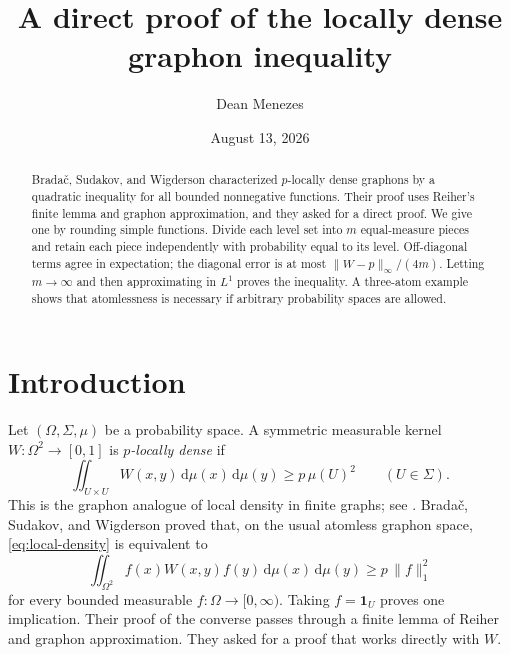 \documentclass[reqno]{amsart}
\theoremstyle{plain}
\theoremstyle{remark}
\newcommand{\one}{\mathbf 1}
\newcommand{\dd}{\,\mathrm d}
\newcommand{\norminf}[1]{\lVert #1\rVert_\infty}
\newcommand{\normone}[1]{\lVert #1\rVert_1}
\begin{document}
\title[A direct proof of the locally dense graphon inequality]
      {A direct proof of the locally dense graphon inequality}

\author{Dean Menezes}
\address{The University of Texas at Austin, Austin, Texas 78712, USA}
\date{August 13, 2026}

\begin{abstract}
Brada\v{c}, Sudakov, and Wigderson characterized $p$-locally dense graphons by
a quadratic inequality for all bounded nonnegative functions. Their proof uses
Reiher's finite lemma and graphon approximation, and they asked for a direct
proof. We give one by rounding simple functions. Divide each level set into
$m$ equal-measure pieces and retain each piece independently with probability
equal to its level. Off-diagonal terms agree in expectation; the diagonal
error is at most $\norminf{W-p}/(4m)$. Letting $m\to\infty$ and then
approximating in $L^1$ proves the inequality. A three-atom example shows that
atomlessness is necessary if arbitrary probability spaces are allowed.
\end{abstract}

\maketitle

\section{Introduction}

Let $(\Omega,\Sigma,\mu)$ be a probability space. A symmetric measurable
kernel $W\colon\Omega^2\to[0,1]$ is \emph{$p$-locally dense} if
\begin{equation}\label{eq:local-density}
  \iint_{U\times U}W(x,y)\dd\mu(x)\dd\mu(y)
  \geq p\,\mu(U)^2
  \qquad(U\in\Sigma).
\end{equation}
This is the graphon analogue of local density in finite graphs; see
\cite{Lovasz}. Brada\v{c}, Sudakov, and Wigderson
\cite[Lemma~2.8]{BSW} proved that, on the usual atomless graphon space,
\eqref{eq:local-density} is equivalent to
\begin{equation}\label{eq:fractional}
  \iint_{\Omega^2}f(x)W(x,y)f(y)\dd\mu(x)\dd\mu(y)
  \geq p\,\normone{f}^{2}
\end{equation}
for every bounded measurable $f\colon\Omega\to[0,\infty)$. Taking
$f=\one_U$ proves one implication. Their proof of the converse passes through
a finite lemma of Reiher \cite{Reiher} and graphon approximation. They asked
for a proof that works directly with $W$.
\end{document}
